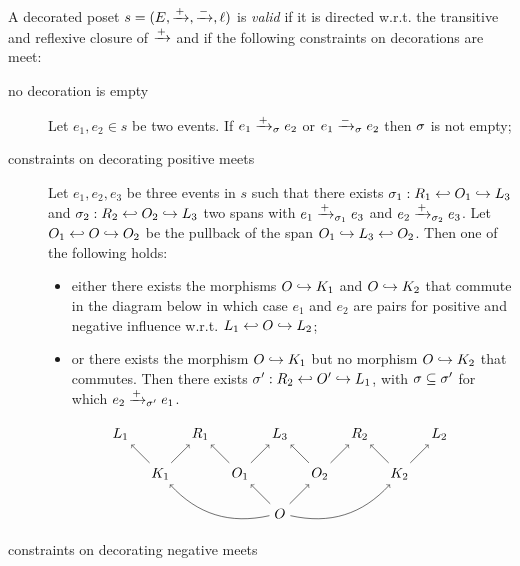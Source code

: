 \begin{definition}
  \label{def:constraints_poset}
  A decorated poset $s = (E,\mathrel{\xrightarrow{+}},\mathrel{\xrightarrow{-}},\ell)$ is \emph{valid} if it is directed w.r.t. the transitive and reflexive closure of $\mathrel{\xrightarrow{+}}$ and if the following constraints on decorations are meet:
  \begin{description}
  \item[no decoration is empty]
    Let $e_1,e_2\in s$ be two events. If $e_1\mathrel{\xrightarrow{+}}_{\sigma} e_2$ or $e_1\mathrel{\xrightarrow{-}}_{\sigma} e_2$ then $\sigma$ is not empty;
  \item[constraints on decorating positive meets]
    Let $e_1,e_2,e_3$ be three events in $s$ such that there exists $\sigma_1:R_1\hookleftarrow O_1\hookrightarrow L_3$ and $\sigma_2:R_2\hookleftarrow O_2\hookrightarrow L_3$ two spans with $e_1\mathrel{\xrightarrow{+}}_{\sigma_1} e_3$ and $e_2\mathrel{\xrightarrow{+}}_{\sigma_2} e_3$.
    Let $O_1\hookleftarrow O\hookrightarrow O_2$ be the pullback of the span $O_1\hookrightarrow L_3 \hookleftarrow O_2$. Then one of the following holds:
    \begin{itemize}
    \item either there exists the morphisms $O\hookrightarrow K_1$ and $O\hookrightarrow K_2$ that commute in the diagram below in which case $e_1$ and $e_2$ are pairs for positive and negative influence w.r.t. $L_1\hookleftarrow O\hookrightarrow L_2$;
    \item or there exists the morphism $O\hookrightarrow K_1$ but no morphism $O\hookrightarrow K_2$ that commutes. Then there exists $\sigma':R_2\hookleftarrow O'\hookrightarrow L_1$, with $\sigma\subseteq \sigma'$ for which $e_2\mathrel{\xrightarrow{+}}_{\sigma'} e_1$.
    \end{itemize}
   \[
    \begin{tikzpicture} %
      \node (o) at (0,-1) {\(O\)};
      \node (r3) at (0,1) {\(L_3\)};
      \node (o1) at (-1,0) {\(O_1\)};
      \node (o2) at (1,0) {\(O_2\)};
      \node (r1) at (-2,1) {\(R_1\)};
      \node (r2) at (2,1) {\(R_2\)};
      \node (l1) at (-4,1) {\(L_1\)};
      \node (l2) at (4,1) {\(L_2\)};
      \node (k1) at (-3,0) {\(K_1\)};
      \node (k2) at (3,0) {\(K_2\)};
      \draw [->] (o) -- (o1);
      \draw [->] (o) -- (o2);
      \draw [->] (o1) -- (r3);
      \draw [->] (o2) -- (r3);
      \draw [->] (o1) -- (r1);
      \draw [->] (o2) -- (r2);
      \draw [->] (k1) -- (r1);
      \draw [->] (k2) -- (r2);
      \draw [->] (k1) -- (l1);
      \draw [->] (k2) -- (l2);
      \draw [->] (o) to [bend left] (k1);
      \draw [->] (o) to [bend right] (k2);
    \end{tikzpicture}
    \]
  \item[constraints on decorating negative meets]

\end{description}
\end{definition}
